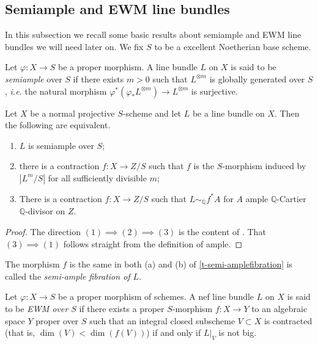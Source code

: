 	\subsection{Semiample and EWM line bundles}
	
	In this subsection we recall some basic results about semiample and EWM line bundles we will need later on. We fix $S$ to be a excellent Noetherian base scheme.
	
	\begin{definition}
		Let $\varphi \colon X \to S$ be a proper morphism. A line bundle $L$ on $X$ is said to be \textit{semiample} over $S$ if there exists $m>0$ such that $L^{\otimes m}$ is globally generated over $S$, \emph{i.e.} the natural morphism $\varphi^*(\varphi_*L^{\otimes m}) \to L^{\otimes m}$ is surjective.
	\end{definition} 
	
	\begin{theorem}\label{t-semiamplefibration}
		Let $X$ be a normal projective $S$-scheme and let $L$ be a line bundle on $X$. Then the following are equivalent.
		\begin{enumerate}
			\item $L$ is semiample over $S$;
			\item there is a contraction 
			$f\colon X\to Z/S$
			such that $f$ is the $S$-morphism induced by $|L^m/S|$ for all sufficiently divisible $m$;
			\item There is a contraction 
			$f\colon X\to Z/S$
			such that $L\sim_{\mathbb{Q}} f^{*}A$ for $A$ ample $\mathbb{Q}$-Cartier $\mathbb{Q}$-divisor on $Z$.
		\end{enumerate}
	\end{theorem}
	
	\begin{proof}
		The direction $(1) \implies (2) \implies (3)$ is the content of \cite[Theorem 2.1.26]{La1}. That $(3) \implies (1)$ follows straight from the definition of ample.
	\end{proof}
	
	The morphism $f$ is the same in both (a) and (b) of \autoref{t-semi-amplefibration} is called the \textit{semi-ample fibration of $L$}.	
	
	\begin{definition}
	Let $\varphi \colon X \to S$ be a proper morphism of schemes. 
	A nef line bundle $L$ on $X$ is said to be \emph{EWM over $S$} if there exists a proper $S$-morphism $f \colon X \rightarrow Y$ to an algebraic space $Y$ proper over $S$ such that an integral closed subscheme $V \subset X$ is contracted (that is, $\dim(V) < \dim (f(V))$) if and only if $L|_V$ is not big. 
	\end{definition}
	
